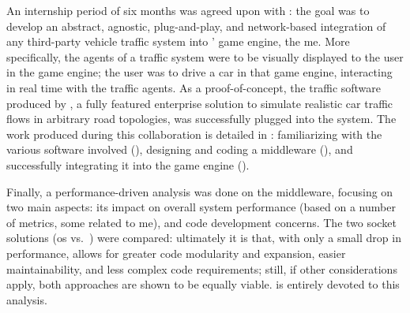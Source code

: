 An internship period of six months was agreed upon with : the goal was to develop an abstract, agnostic, plug-and-play, and network-based integration of any third-party vehicle traffic system into ' game engine, the \gls{me}. More specifically, the agents of a traffic system were to be visually displayed to the user in the game engine; the user was to drive a car in that game engine, interacting in real time with the traffic agents. As a proof-of-concept, the traffic software produced by , a fully featured enterprise solution to simulate realistic car traffic flows in arbitrary road topologies, was successfully plugged into the system. The work produced during this collaboration is detailed in : familiarizing with the various software involved (), designing and coding a \gls{middleware} (), and successfully integrating it into the game engine ().


Finally, a performance-driven analysis was done on the \gls{middleware}, focusing on two main aspects: its impact on overall system performance (based on a number of metrics, some related to \gls{me}), and code development concerns. The two socket solutions (\gls{os} vs.\ ) were compared: ultimately it is  that, with only a small drop in performance, allows for greater code modularity and expansion, easier maintainability, and less complex code requirements; still, if other considerations apply, both approaches are shown to be equally viable.  is entirely devoted to this analysis.
